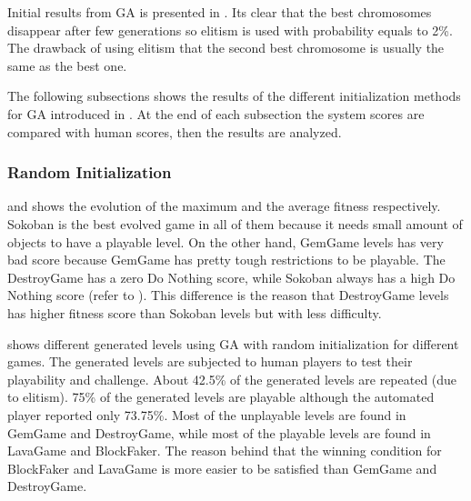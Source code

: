 Initial results from GA is presented in . Its clear that the best chromosomes disappear after few generations so elitism is used with probability equals to 2\%. The drawback of using elitism that the second best chromosome is usually the same as the best one.


The following subsections shows the results of the different initialization methods for GA introduced in . At the end of each subsection the system scores are compared with human scores, then the results are analyzed.

\subsubsection{Random Initialization}
 and  shows the evolution of the maximum and the average fitness respectively. Sokoban is the best evolved game in all of them because it needs small amount of objects to have a playable level. On the other hand, GemGame levels has very bad score because GemGame has pretty tough restrictions to be playable. The DestroyGame has a zero Do Nothing score, while Sokoban always has a high Do Nothing score (refer to ). This difference is the reason that DestroyGame levels has higher fitness score than Sokoban levels but with less difficulty.




 shows different generated levels using GA with random initialization for different games. The generated levels are subjected to human players to test their playability and challenge. About 42.5\% of the generated levels are repeated (due to elitism). 75\% of the generated levels are playable although the automated player reported only 73.75\%. Most of the unplayable levels are found in GemGame and DestroyGame, while most of the playable levels are found in LavaGame and BlockFaker. The reason behind that the winning condition for BlockFaker and LavaGame is more easier to be satisfied than GemGame and DestroyGame.\\\par 

